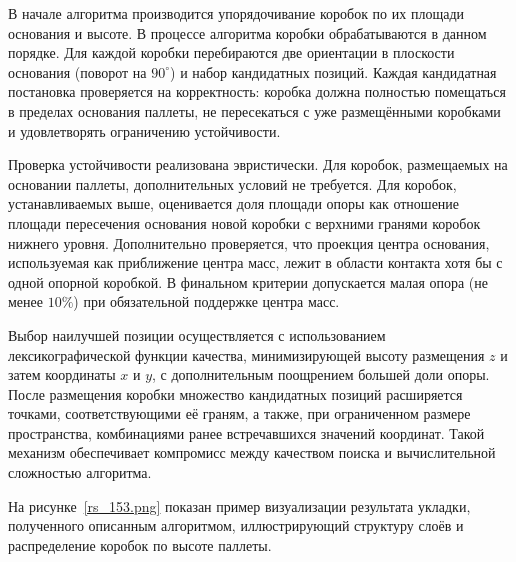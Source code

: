 В начале алгоритма производится упорядочивание коробок по их площади основания и высоте. В процессе алгоритма коробки обрабатываются в данном порядке. Для каждой коробки перебираются две ориентации в плоскости основания (поворот на $90^\circ$) и набор кандидатных позиций. Каждая кандидатная постановка проверяется на корректность: коробка должна полностью помещаться в пределах основания паллеты, не пересекаться с уже размещёнными коробками и удовлетворять ограничению устойчивости.

Проверка устойчивости реализована эвристически. Для коробок, размещаемых на основании паллеты, дополнительных условий не требуется. Для коробок, устанавливаемых выше, оценивается доля площади опоры как отношение площади пересечения основания новой коробки с верхними гранями коробок нижнего уровня. Дополнительно проверяется, что проекция центра основания, используемая как приближение центра масс, лежит в области контакта хотя бы с одной опорной коробкой. В финальном критерии допускается малая опора (не менее $10\%$) при обязательной поддержке центра масс.

Выбор наилучшей позиции осуществляется с использованием лексикографической функции качества, минимизирующей высоту размещения $z$ и затем координаты $x$ и $y$, с дополнительным поощрением большей доли опоры. После размещения коробки множество кандидатных позиций расширяется точками, соответствующими её граням, а также, при ограниченном размере пространства, комбинациями ранее встречавшихся значений координат. Такой механизм обеспечивает компромисс между качеством поиска и вычислительной сложностью алгоритма.

На рисунке~\ref{rs_153.png} показан пример визуализации результата укладки, полученного описанным алгоритмом, иллюстрирующий структуру слоёв и распределение коробок по высоте паллеты.

